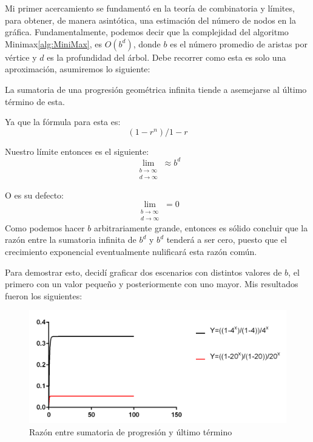 Mi primer acercamiento se fundamentó en la teoría de combinatoria y límites, para obtener, de manera asintótica, una estimación del número de nodos en la gráfica. Fundamentalmente, podemos decir que la complejidad del algoritmo Minimax\ref{alg:MiniMax}, es $O(b^d)$, donde $b$ es el número promedio de aristas por vértice y $d$ es la profundidad del árbol. Debe recorrer  como esta es solo una  aproximación, asumiremos lo siguiente: 

La sumatoria de una progresión geométrica infinita tiende a asemejarse al último término de esta. 

Ya que la fórmula para esta es:
\begin{equation}
(1-r^n)/1-r
\end{equation}

Nuestro límite entonces es el siguiente: 
\begin{equation}
\lim_{\substack{b\to \infty \\ d\to \infty}} \approx b^d
\end{equation}



O es su defecto:
\begin{equation}
\lim_{\substack{b\to \infty \\ d\to \infty}} = 0
\end{equation} 
Como podemos hacer $b$ arbitrariamente grande, entonces es sólido concluir que la razón entre la sumatoria infinita de $b^d$ y $b^d$ tenderá a ser cero, puesto que el crecimiento exponencial eventualmente nulificará esta razón común. 

Para demostrar esto, decidí graficar dos escenarios con distintos valores de $b$, el primero con un valor pequeño y posteriormente con uno mayor. Mis resultados fueron los siguientes: 
\begin{figure}[H]
\centering
\includegraphics{Graphs/Funciones1.png}
\caption{Razón entre sumatoria de progresión y último término}\label{graf1}
\end{figure}


